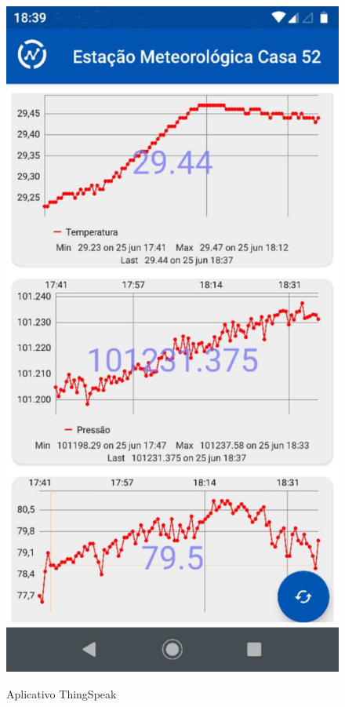\begin{figure} [!h]
    \centering
    \caption{Aplicativo ThingSpeak}
    \includegraphics [scale=0.13]{Figuras/img_app.png}
    \label{fig:img_app}
\end{figure}

